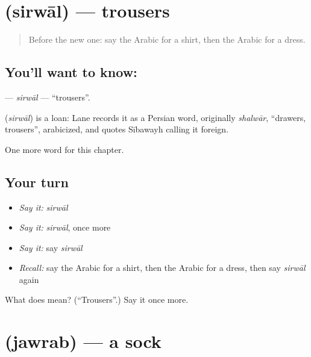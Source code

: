 \section[\texorpdfstring{\ar{سروال} (sirwāl)}{سروال (sirwāl)}]{ (sirwāl) — trousers}

\label{lesson:AR-C94-sirwal}



\begin{quote}
Before the new one: say the Arabic for a shirt, then the Arabic for a dress.
\end{quote}

\subsection*{You'll want to know: }
\textbf{} — \emph{sirwāl} — \textquotedblleft{}trousers\textquotedblright{}.

\begin{cousinweb}
\textbf{} (\emph{sirwāl}) is a loan: Lane records it as a Persian word, originally \emph{shalwār}, \textquotedblleft{}drawers, trousers\textquotedblright{}, arabicized, and quotes Sībawayh calling it foreign.
\end{cousinweb}

\begin{grammarlens}[title={What you've built}]
One more word for this chapter.
\end{grammarlens}

\subsection*{Your turn}
\begin{itemize}
\raggedright
  \item \emph{Say it:} \emph{sirwāl}
  \item \emph{Say it:} \emph{sirwāl}, once more
  \item \emph{Say it:} say \emph{sirwāl}
  \item \emph{Recall:} say the Arabic for a shirt, then the Arabic for a dress, then say \emph{sirwāl} again
\end{itemize}

\begin{tcolorbox}[breakable,colback=teal!4,colframe=teal!35!black,title={Before you move on}]
What does  mean? (\textquotedblleft{}Trousers\textquotedblright{}.) Say it once more.
\end{tcolorbox}
\section[\texorpdfstring{\ar{جورب} (jawrab)}{جورب (jawrab)}]{ (jawrab) — a sock}

